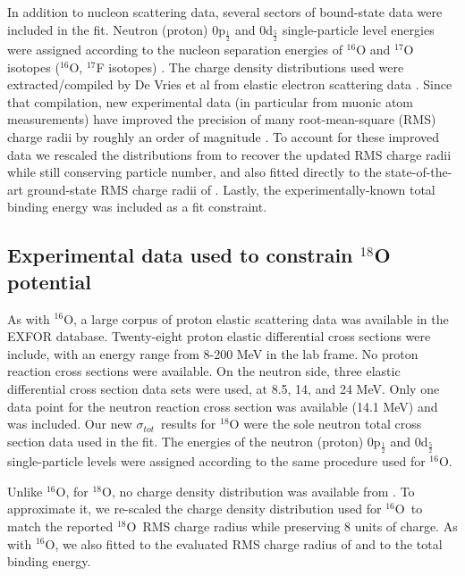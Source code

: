 \documentclass[twocolumn,secnumarabic,amssymb, nobibnotes, aps, prl,
superscriptaddress, nobalancelastpage]{revtex4}
\newcommand{\tot}{\ensuremath{\sigma_{tot}}}
\newcommand{\oSix}{\ensuremath{^{16}}O}
\newcommand{\oEight}{\ensuremath{^{18}}O}
\begin{document}
In addition to nucleon scattering data, several sectors of bound-state data were
included in the fit. Neutron (proton) 0p$_{\frac{1}{2}}$ and 0d$_{\frac{5}{2}}$
single-particle level energies were
assigned according to the nucleon separation energies of $^{16}$O and
$^{17}$O isotopes ($^{16}$O, $^{17}$F isotopes) \cite{AME2016}.
The charge density distributions used were extracted/compiled by
De Vries et al from elastic electron scattering data
\cite{DeVries1987}. Since that compilation, new experimental
data (in particular from muonic atom measurements) have improved the precision
of many root-mean-square (RMS) charge radii by
roughly an order of magnitude \cite{Angeli2013}. To account for these improved
data we rescaled the distributions from \cite{DeVries1987} to recover the updated
RMS charge radii while still conserving particle number, and also fitted directly
to the state-of-the-art ground-state RMS charge radii of \cite{Angeli2013}.
Lastly, the experimentally-known total binding energy was included as a fit constraint. 

\subsection{Experimental data used to constrain $^{18}$O potential}

As with $^{16}$O, a large corpus of proton elastic scattering data was
available in the EXFOR database. Twenty-eight proton elastic differential cross
sections were include, with an energy range from 8-200 MeV in the lab frame.
No proton reaction cross sections were available. On the neutron side, three
elastic differential cross section data sets were used, at 8.5, 14, and 24 MeV.
Only one data point for the neutron reaction cross section was available (14.1
MeV) and was included. Our new \tot\ results for $^{18}$O were the
sole neutron total cross section data used in the fit. The energies of the
neutron (proton) 0p$_{\frac{1}{2}}$ and 0d$_{\frac{5}{2}}$ single-particle
levels were assigned according to the same procedure used for \oSix.

Unlike \oSix, for \oEight, no charge density distribution was available from
\cite{DeVries1987}. To approximate it, we re-scaled the charge density
distribution used for \oSix\ to match the reported \oEight\ RMS charge radius
while preserving 8 units of charge. As with \oSix, we also fitted to the
evaluated RMS charge radius of \cite{MuonicAtoms} and to the total binding
energy.
\end{document}
